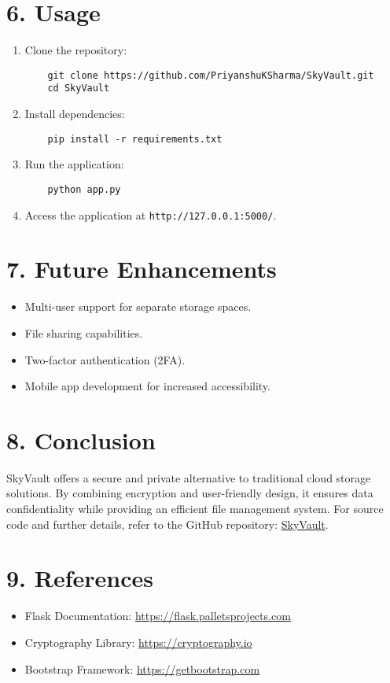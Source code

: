 \documentclass[12pt,a4paper]{article}
\begin{document}
\section*{6. Usage}
\begin{tcolorbox}[colback=gray!5!white, colframe=gray!75!black, sharp corners, boxrule=0.5mm]
\begin{enumerate}
    \item Clone the repository:
    \begin{Verbatim}
    git clone https://github.com/PriyanshuKSharma/SkyVault.git
    cd SkyVault
    \end{Verbatim}
    \item Install dependencies:
    \begin{Verbatim}
    pip install -r requirements.txt
    \end{Verbatim}
    \item Run the application:
    \begin{Verbatim}
    python app.py
    \end{Verbatim}
    \item Access the application at \texttt{http://127.0.0.1:5000/}.
\end{enumerate}
\end{tcolorbox}

\section*{7. Future Enhancements}
\begin{itemize}
    \item Multi-user support for separate storage spaces.
    \item File sharing capabilities.
    \item Two-factor authentication (2FA).
    \item Mobile app development for increased accessibility.
\end{itemize}

\section*{8. Conclusion}
SkyVault offers a secure and private alternative to traditional cloud storage solutions. By combining encryption and user-friendly design, it ensures data confidentiality while providing an efficient file management system. For source code and further details, refer to the GitHub repository: \href{https://github.com/PriyanshuKSharma/SkyVault.git}{SkyVault}.

\section*{9. References}
\begin{itemize}
    \item Flask Documentation: \url{https://flask.palletsprojects.com}
    \item Cryptography Library: \url{https://cryptography.io}
    \item Bootstrap Framework: \url{https://getbootstrap.com}
\end{itemize}
\end{document}
